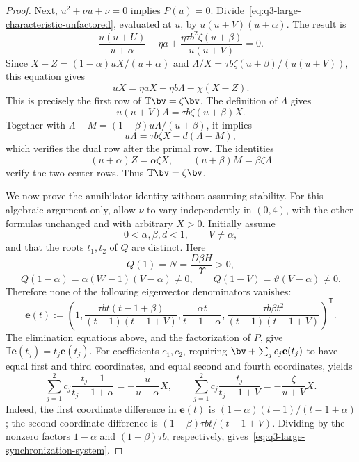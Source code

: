 \begin{proof}
Next, \(u^2+\nu u+\nu=0\) implies \(P(u)=0\).
Divide~\eqref{eq:q3-large-characteristic-unfactored}, evaluated at
\(u\), by \(u(u+V)(u+\alpha)\). The result is
\[
\frac{u(u+U)}{u+\alpha}-\eta a
 +\frac{\eta\tau b^2\zeta(u+\beta)}{u(u+V)}=0.
\]
Since
\(X-Z=(1-\alpha)uX/(u+\alpha)\) and
\(\Lambda/X=\tau b\zeta(u+\beta)/(u(u+V))\), this equation gives
\[
uX=\eta aX-\eta b\Lambda-\chi(X-Z).
\]
This is precisely the first row of \(\mathbb{T}\bv=\zeta\bv\).
The definition of \(\Lambda\) gives
\[
u(u+V)\Lambda=\tau b\zeta(u+\beta)X.
\]
Together with
\(\Lambda-M=(1-\beta)u\Lambda/(u+\beta)\), it implies
\[
u\Lambda=\tau b\zeta X-d(\Lambda-M),
\]
which verifies the dual row after the primal row.
The identities
\[
(u+\alpha)Z=\alpha\zeta X,
\qquad (u+\beta)M=\beta\zeta\Lambda
\]
verify the two center rows. Thus \(\mathbb{T}\bv=\zeta\bv\).

We now prove the annihilator identity without assuming stability.
For this algebraic argument only, allow \(\nu\) to vary independently
in \((0,4)\), with the other formulas unchanged and with arbitrary
\(X>0\). Initially assume
\[
0<\alpha,\beta,d<1,\qquad V\ne\alpha,
\]
and that the roots \(t_1,t_2\) of \(Q\) are distinct.
Here
\[
Q(1)=N=\frac{D\beta H}{\Upsilon}>0,
\]
\[
Q(1-\alpha)=\alpha(W-1)(V-\alpha)\ne0,
\qquad Q(1-V)=\vartheta(V-\alpha)\ne0.
\]
Therefore none of the following eigenvector denominators vanishes:
\[
\mathbf{e}(t):=
\left(
1,\frac{\tau bt(t-1+\beta)}{(t-1)(t-1+V)},
\frac{\alpha t}{t-1+\alpha},
\frac{\tau b\beta t^2}{(t-1)(t-1+V)}
\right)^{\mathsf{T}}.
\]
The elimination equations above, and the factorization of \(P\), give
\(\mathbb{T}\mathbf{e}(t_j)=t_j\mathbf{e}(t_j)\).
For coefficients \(c_1,c_2\), requiring
\(\bv+\sum_jc_j\mathbf{e}(t_j)\) to have equal first and third
coordinates, and equal second and fourth coordinates, yields
\begin{equation}
\sum_{j=1}^2c_j\frac{t_j-1}{t_j-1+\alpha}
=-\frac{u}{u+\alpha}X,
\qquad
\sum_{j=1}^2c_j\frac{t_j}{t_j-1+V}
=-\frac{\zeta}{u+V}X.
\label{eq:q3-large-synchronization-system}
\end{equation}
Indeed, the first coordinate difference in \(\mathbf{e}(t)\) is
\((1-\alpha)(t-1)/(t-1+\alpha)\); the second coordinate
difference is \((1-\beta)\tau bt/(t-1+V)\). Dividing by the
nonzero factors \(1-\alpha\) and \((1-\beta)\tau b\),
respectively, gives~\eqref{eq:q3-large-synchronization-system}.


\end{proof}
